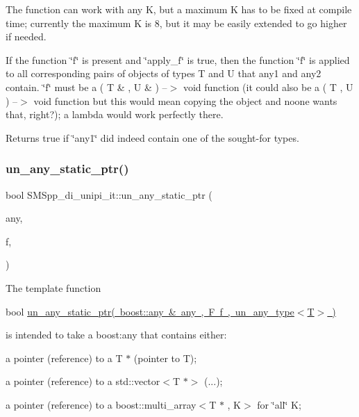 The function can work with any K, but a maximum K has to be fixed at compile time; currently the maximum K is 8, but it may be easily extended to go higher if needed.

If the function \char`\"{}f\char`\"{} is present and \char`\"{}apply\+\_\+f\char`\"{} is true, then the function \char`\"{}f\char`\"{} is applied to all corresponding pairs of objects of types T and U that any1 and any2 contain. \char`\"{}f\char`\"{} must be a ( T \& , U \& ) --$>$ void function (it could also be a ( T , U ) --$>$ void function but this would mean copying the object and noone wants that, right?); a lambda would work perfectly there.

Returns true if \char`\"{}any1\char`\"{} did indeed contain one of the sought-\/for types. \mbox{\label{group__boost__any__stuff_ga52fc4cc92fd415dd9ba1ae8b68f44931}} 
\subsubsection{\texorpdfstring{un\+\_\+any\+\_\+static\+\_\+ptr()}{un\_any\_static\_ptr()}}
{\footnotesize\ttfamily bool S\+M\+Spp\+\_\+di\+\_\+unipi\+\_\+it\+::un\+\_\+any\+\_\+static\+\_\+ptr (\begin{DoxyParamCaption}\item[{boost\+::any \&}]{any,  }\item[{F}]{f,  }\item[{\mbox{\hyperlink{struct_s_m_spp__di__unipi__it_1_1un__any__type}{un\+\_\+any\+\_\+type}}$<$ T $>$}]{ }\end{DoxyParamCaption})}

The template function

bool \mbox{\hyperlink{group__boost__any__stuff_ga52fc4cc92fd415dd9ba1ae8b68f44931}{un\+\_\+any\+\_\+static\+\_\+ptr( boost\+::any \& any , F f , un\+\_\+any\+\_\+type$<$\+T$>$ )}}

is intended to take a boost\+:any that contains either\+:


\begin{DoxyItemize}
\item a pointer (reference) to a T $\ast$ (pointer to T);
\item a pointer (reference) to a std\+::vector$<$\+T $\ast$$>$ (...);
\item a pointer (reference) to a boost\+::multi\+\_\+array$<$\+T $\ast$ , K$>$ for \char`\"{}all\char`\"{} K;
\end{DoxyItemize}

